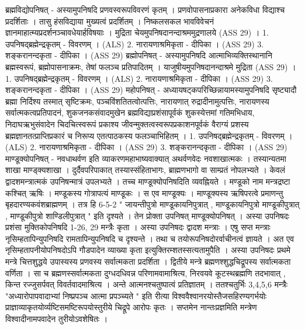 
ब्रह्मविद्योपनिषत् -
अस्यामुपनिषदि प्रणवस्वरूपविवरणं कृतम् । प्रणवोपासनाप्रकारा अनेकविधा विद्याश्च प्रदर्शिताः । तासु हंसविद्याया मुख्यत्वं प्रदर्शितम् । निष्कलसकल भावविवेचनं ज्ञानमाहात्म्यप्रदर्शनञ्चावधेयार्हविषयाः । मुद्रिता चेयमुपनिषदानन्दाश्रममुद्रणालये (ASS 29) । 
1. उपनिषद्ब्रह्मेन्द्रकृतम् - विवरणम् । (ALS)
2. नारायणाश्रमिकृता - दीपिका । (ASS 29)
3. शङ्करानन्दकृता - दीपिका । (ASS 29)
ब्रह्मोपनिषत् - 
अस्यामुपनिषदि आत्माभिव्यक्तिस्थानानि ब्रह्मस्वरूपं, ब्रह्मोपासनाक्रमः, तेषां फलञ्च प्रतिपादितम् । याजुषीयमुपनिषदानन्दाश्रमे मुद्रिता  (ASS 29) । 
1. उपनिषद्ब्रह्मेन्द्रकृतम् - विवरणम् । (ALS)
2. नारायणाश्रमिकृता - दीपिका । (ASS 29)
3. शङ्करानन्दकृता - दीपिका । (ASS 29)
महोपनिषत् - 
अध्यायषट्कपरिच्छिन्नायामस्यामुपनिषदि सृष्ट्यादौ ब्रह्मा निर्दिश्य तस्मात् सृष्टिक्रमः, पञ्चविंशतितत्वोत्पत्तिः, नारायणात् रुद्रादीनामुत्पत्तिः, नारायणस्य सर्वात्मकत्वप्रतिपादनं, शुकजनकसंवादमुखेन ब्रह्मविद्याप्रशंसापूर्वकं शुकस्येत्तमां गतिमभिधाय, निदाघऋभुसंवादेन चिदचित्स्वरूपं प्रकाश्य जीवन्मुक्तत्वस्वरूपप्रकाशनपूर्वकं वैराग्यं प्रशस्य ब्रह्मज्ञानतत्प्राप्तिप्रकारं च निरूप्य एतत्पाठकस्य फलञ्चाभिहितम् ।
1. उपनिषद्ब्रह्मेन्द्रकृतम् - विवरणम् । (ALS)
2. नारायणाश्रमिकृता - दीपिका । (ASS 29)
3. शङ्करानन्दकृता - दीपिका । (ASS 29)
माण्डूक्योपनिषत् - 
नवधाथर्वण इति व्याकरणमहाभाष्यवाक्यात् अथर्वणवेदः नवशाखात्मकः । तस्यान्यतमा शाखा माण्ड्क्यशाखा । दुर्दैवपरिपाकात् तस्यास्संहिताभागः, ब्राह्मणभागो वा साम्प्रतं नोपलभ्यते । केवलं द्वादशमन्त्रात्मकं उपनिषन्मात्रं उपलभ्यते । तच्च माण्डूक्योपनिषदिति व्यवह्नियते । 
मण्डूको नाम मन्त्रद्रष्टा कश्चित् ऋषिः । मण्डूकस्य गोत्रापत्यं माण्डूकः । स एव माण्डूक्यः । माण्डूक्यस्य ऋषिपरत्वे प्रमाणन्तु बृहदारण्यकवंशब्राह्मणम् । तत्र हि 6-5-2 " जायन्तीपुत्रो माण्डूकायनिपुत्रात् , माण्डूकायनिपुत्रो माण्डूकीपुत्रात् , माण्डूकीपुत्रो शाण्डिलीपुत्रात् " इति दृश्यते । तेन प्रोक्ता उपनिषत् माण्डूक्योपनिषत् । अस्या उपनिषदः प्रशंसा मुक्तिकोपनिषदि 1-26, 29 मन्त्रैः कृता । अस्या उपनिषदः द्वादश मन्त्राः । एषु सप्त मन्त्राः नृसिम्हतापिन्युपनिषदि रामतापिन्युपनिषदि च दृश्यन्ते । तथा च तयोरूपनिषदोरर्वाचीनत्वं ज्ञायते । अत एव नृसिम्हतापनीयोपनिषदोऽपि गौडपादेन व्याख्या कृता इत्युक्तिरम्शतस्सत्यतामुपैति । 
अस्या उपनिषदः प्रथमे मन्त्रे चित्तशुद्धये उपास्यस्य प्रणवस्य सर्वात्मकता प्रदर्शिता । द्वितीये मन्त्रे ब्रह्मणश्शुद्धचिद्रूपस्य सर्वात्मकता वर्णिता । सा च ब्रह्मणस्सर्वात्मकता दुग्धदधिवन्न परिणामवामाश्रित्य, निरवयवे कूटस्थब्रह्मणि तदभावात् , किन्त रज्जुसर्पवत् विवर्तवादमाश्रित्य । अन्ते आत्मनश्चतुष्पात्वं प्रतिज्ञातम् । ततश्चतुर्भिः 3,4,5,6 मन्त्रैः "अध्यारोपापवादाभ्यां निष्प्रपञ्च आत्मा प्रपञ्च्यते " इति रीत्या विश्ववैश्वानरयोस्तैजसहिरण्यगर्भयोः प्राज्ञाव्याकृतयोर्व्यष्टिसमष्टिरूपयोस्तुरीये चिद्रूपे आरोपः कृतः । सप्तमेन नान्तःप्रज्ञमिति मन्त्रेण विश्वादीनामपवादेन तुरीयोऽवशेषितः । 
